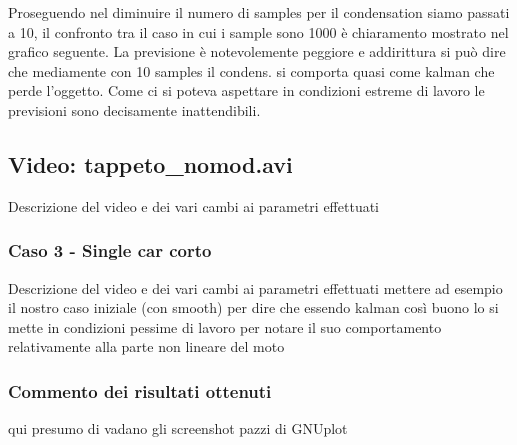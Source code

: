 Proseguendo nel diminuire il numero di samples per il condensation siamo passati a 10, il confronto tra il caso in cui i sample sono 1000 è chiaramento mostrato nel grafico seguente. La previsione è notevolemente peggiore e addirittura si può dire che mediamente con 10 samples il condens. si comporta quasi come kalman  che perde l'oggetto. Come ci si poteva aspettare in condizioni estreme di lavoro le previsioni sono decisamente inattendibili.


\subsection{Video: tappeto_nomod.avi}
Descrizione del video e dei vari cambi ai parametri effettuati

\subsubsection{Caso 3 - Single car corto}
Descrizione del video e dei vari cambi ai parametri effettuati mettere ad esempio il nostro caso iniziale (con smooth) per dire che essendo kalman così buono lo si mette in condizioni pessime di lavoro per notare il suo comportamento relativamente alla parte non lineare del moto

\subsubsection{Commento dei risultati ottenuti}
qui presumo di vadano gli screenshot pazzi di GNUplot

